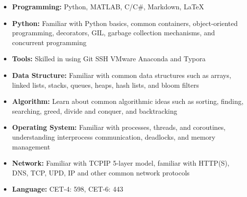 \ifzh
    \begin{competences}
    \end{competences}
\else
    \begin{itemize}[leftmargin=1.5em]
        \item \textbf{Programming:} Python, MATLAB, C/C\#, Markdown, \LaTeX
        \item \textbf{Python:} Familiar with Python basics, common containers, object-oriented programming, decorators, GIL, garbage collection mechanisms, and concurrent programming
        \item \textbf{Tools:} Skilled in using Git SSH VMware Anaconda and Typora
        \item \textbf{Data Structure:} Familiar with common data structures such as arrays, linked lists, stacks, queues, heaps, hash lists, and bloom filters
        \item \textbf{Algorithm:} Learn about common algorithmic ideas such as sorting, finding, searching, greed, divide and conquer, and backtracking
        \item \textbf{Operating System:} Familiar with processes, threads, and coroutines, understanding interprocess communication, deadlocks, and memory management
        \item \textbf{Network:} Familiar with TCPIP 5-layer model, familiar with HTTP(S), DNS, TCP, UPD, IP and other common network protocols
        \item \textbf{Language:} CET-4: 598, CET-6: 443
    \end{itemize}
\fi